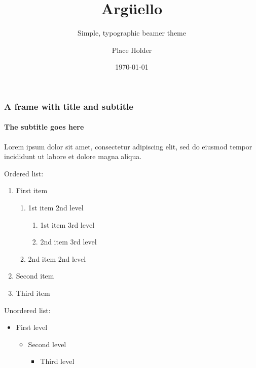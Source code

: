 \documentclass{beamer}
\title{Argüello}
\subtitle{Simple, typographic beamer theme}
\date{\today}
\author{Place Holder}
\institute{University of \TeX\par\email{username@domain.com}}
\begin{document}

\begin{frame}
      \frametitle{A frame with title and subtitle}
      \framesubtitle{The subtitle goes here}
      Lorem ipsum dolor sit amet, consectetur adipiscing elit, sed do eiusmod tempor incididunt ut labore et dolore magna aliqua.\par
      \vfill
      Ordered list:
      \begin{enumerate}
            \item First item
                  \begin{enumerate}
                        \item 1st item 2nd level
                              \begin{enumerate}
                                    \item 1st item 3rd level
                                    \item 2nd item 3rd level
                              \end{enumerate}
                        \item 2nd item 2nd level
                  \end{enumerate}
            \item Second item
            \item Third item
      \end{enumerate}
      \vfill
      Unordered list:
      \begin{itemize}
            \item First level
                  \begin{itemize}
                        \item Second level
                              \begin{itemize}
                                    \item Third level
                              \end{itemize}
                  \end{itemize}
      \end{itemize}
\end{frame}
\end{document}
